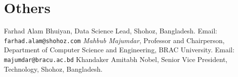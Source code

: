 \documentclass[11pt,a4paper]{moderncv}
\begin{document}
\section{Others}


\begin{thebibliography}{99}
	 Farhad Alam Bhuiyan, Data Science Lead, Shohoz, Bangladesh. Email: \texttt{farhad.alam@shohoz.com}
	 \textit{Mahbub Majumdar}, Professor and Chairperson, Department of Computer Science and Engineering, BRAC University. Email: \texttt{majumdar@bracu.ac.bd}
	 Khandaker Amitabh Nobel, Senior Vice President, Technology, Shohoz, Bangladesh.
\end{thebibliography}
\nocite{*}
\end{document}
